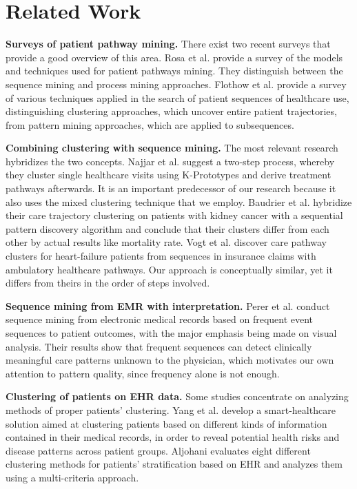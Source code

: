 \section{Related Work}
\label{sec:related}

\textbf{Surveys of patient pathway mining.} There exist two recent surveys that provide a good overview of this area. Rosa et al. \cite{rosa2022modelling} provide a survey of the models and techniques used for patient pathways mining. They distinguish between the sequence mining and process mining approaches. Flothow et al. \cite{flothow2023} provide a survey of various techniques applied in the search of patient sequences of healthcare use, distinguishing clustering approaches, which uncover entire patient trajectories, from pattern mining approaches, which are applied to subsequences.

\textbf{Combining clustering with sequence mining.} The most relevant research hybridizes the two concepts. Najjar et al. \cite{najjar2018twostep} suggest a two-step process, whereby they cluster single healthcare visits using K-Prototypes and derive treatment pathways afterwards. It is an important predecessor of our research because it also uses the mixed clustering technique that we employ. Baudrier et al. \cite{baudrier2022} hybridize their care trajectory clustering on patients with kidney cancer with a sequential pattern discovery algorithm and conclude that their clusters differ from each other by actual results like mortality rate. Vogt et al. \cite{vogt2017} discover care pathway clusters for heart-failure patients from sequences in insurance claims with ambulatory healthcare pathways. Our approach is conceptually similar, yet it differs from theirs in the order of steps involved.

\textbf{Sequence mining from EMR with interpretation.} Perer et al. \cite{perer2015mining} conduct sequence mining from electronic medical records based on frequent event sequences to patient outcomes, with the major emphasis being made on visual analysis. Their results show that frequent sequences can detect clinically meaningful care patterns unknown to the physician, which motivates our own attention to pattern quality, since frequency alone is not enough.

\textbf{Clustering of patients on EHR data.} Some studies concentrate on analyzing methods of proper patients' clustering. Yang et al. \cite{yang2024} develop a smart-healthcare solution aimed at clustering patients based on different kinds of information contained in their medical records, in order to reveal potential health risks and disease patterns across patient groups. Aljohani \cite{aljohani2024} evaluates eight different clustering methods for patients' stratification based on EHR and analyzes them using a multi-criteria approach.

